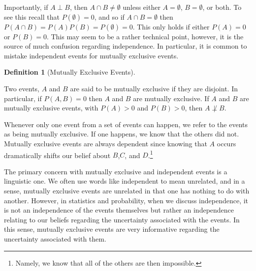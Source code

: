 \documentclass[
  letterpaper,
  DIV=11,
  numbers=noendperiod]{scrreprt}
\theoremstyle{definition}
\newtheorem{definition}{Definition}[chapter]
\theoremstyle{definition}
\theoremstyle{definition}
\theoremstyle{remark}
\begin{document}
Importantly, if \(A\perp B\), then \(A\cap B\neq \emptyset\) unless
either \(A=\emptyset\), \(B=\emptyset\), or both. To see this recall
that \(P(\emptyset) = 0\), and so if \(A\cap B = \emptyset\) then
\(P(A\cap B) = P(A)P(B) = P(\emptyset) = 0\). This only holds if either
\(P(A) = 0\) or \(P(B) = 0\). This may seem to be a rather technical
point, however, it is the source of much confusion regarding
independence. In particular, it is common to mistake independent events
for mutually exclusive events.

\begin{definition}[Mutually Exclusive
Events]\protect\hypertarget{def-mutually-exclusive-events}{}\label{def-mutually-exclusive-events}

Two events, \(A\) and \(B\) are said to be mutually exclusive if they
are disjoint. In particular, if \(P(A,B) = 0\) then \(A\) and \(B\) are
mutually exclusive. If \(A\) and \(B\) are mutually exclusive events,
with \(P(A) > 0\) and \(P(B) > 0\), then \(A\not\perp B\).

\end{definition}

Whenever only one event from a set of events can happen, we refer to the
events as being mutually exclusive. If one happens, we know that the
others did not. Mutually exclusive events are always dependent since
knowing that \(A\) occurs dramatically shifts our belief about
\(B\),\(C\), and \(D\).\footnote{Namely, we know that all of the others
  are then impossible.}

The primary concern with mutually exclusive and independent events is a
linguistic one. We often use words like independent to mean unrelated,
and in a sense, mutually exclusive events are unrelated in that one has
nothing to do with another. However, in statistics and probability, when
we discuss independence, it is not an independence of the events
themselves but rather an independence relating to our beliefs regarding
the uncertainty associated with the events. In this sense, mutually
exclusive events are very informative regarding the uncertainty
associated with them.
\end{document}
